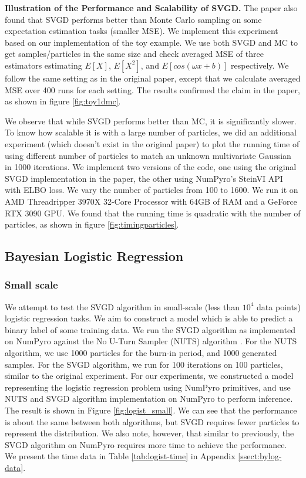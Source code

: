\noindent\textbf{Illustration of the Performance and Scalability of SVGD.} The paper also found that SVGD performs better than Monte Carlo sampling on some expectation estimation tasks (smaller MSE). We implement this experiment based on our implementation of the toy example. We use both SVGD and MC to get samples/particles in the same size and check averaged MSE of three estimators estimating $E[X]$, $E[X^2]$, and $E[cos(\omega x + b)]$ respectively. We follow the same setting as in the original paper, except that we calculate averaged MSE over 400 runs for each setting. The results confirmed the claim in the paper, as shown in figure \ref{fig:toy1dmc}.



We observe that while SVGD performs better than MC, it is significantly slower. To know how scalable it is with a large number of particles, we did an additional experiment (which doesn't exist in the original paper) to plot the running time of using different number of particles to match an unknown multivariate Gaussian in 1000 iterations. We implement two versions of the code, one using the original SVGD implementation in the paper, the other using NumPyro's SteinVI API with ELBO loss. We vary the number of particles from 100 to 1600. We run it on AMD Threadripper 3970X 32-Core Processor with 64GB of RAM and a GeForce RTX 3090 GPU. We found that the 
running time is quadratic with the number of particles, as shown in figure \ref{fig:timingparticles}.



\subsection{Bayesian Logistic Regression}
\subsubsection{Small scale}
We attempt to test the SVGD algorithm in small-scale (less than $10^4$ data points) logistic regression tasks. We aim to construct a model which is able to predict a binary label of some training data. We run the SVGD algorithm as implemented on NumPyro against the No U-Turn Sampler (NUTS) algorithm \cite{nuts}. For the NUTS algorithm, we use 1000 particles for the burn-in period, and 1000 generated samples. For the SVGD algorithm, we run for 100 iterations on 100 particles, similar to the original experiment. For our experiments, we constructed a model representing the logistic regression problem using NumPyro primitives, and use NUTS and SVGD algorithm implementation on NumPyro to perform inference. The result is shown in Figure \ref{fig:logist_small}. We can see that the performance is about the same between both algorithms, but SVGD requires fewer particles to represent the distribution. We also note, however, that similar to previously, the SVGD algorithm on NumPyro requires more time to achieve the performance. We present the time data in Table \ref{tab:logist-time} in Appendix \ref{ssect:bylog-data}.

